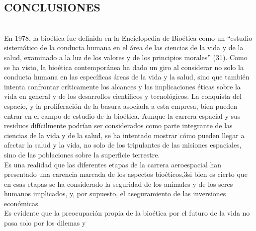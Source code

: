 \documentclass[12pt,letterpaper]{article}
\begin{document}
\begin{multicols}{2}
\section*{ \small {CONCLUSIONES}}\\
\noindent En 1978, la bioética fue definida en la Enciclopedia de
Bioética como un “estudio sistemático de la conducta
humana en el área de las ciencias de la vida y de
la salud, examinado a la luz de los valores y de los
principios morales” (31). Como se ha visto, la bioética
contemporánea ha dado un giro al considerar no solo la
conducta humana en las específicas áreas de la vida y la
salud, sino que también intenta confrontar críticamente
los alcances y las implicaciones éticas sobre la vida en
general y de los desarrollos científicos y tecnológicos.
La conquista del espacio, y la proliferación de la basura
asociada a esta empresa, bien pueden entrar en el campo
de estudio de la bioética. Aunque la carrera espacial
y sus residuos difícilmente podrían ser considerados
como parte integrante de las ciencias de la vida y de
la salud, se ha intentado mostrar cómo pueden llegar
a afectar la salud y la vida, no solo de los tripulantes de
las misiones espaciales, sino de las poblaciones sobre la
superficie terrestre.
\\

\noindent Es una realidad que las diferentes etapas de la carrera
aeroespacial han presentado una carencia marcada de
los aspectos bioéticos,3si bien es cierto que en esas
etapas se ha considerado la seguridad de los animales
y de los seres humanos implicados, y, por supuesto, el
aseguramiento de las inversiones económicas.
\\

\noindent Es evidente que la preocupación propia de la bioética
por el futuro de la vida no pasa solo por los dilemas y 

\end{multicols}
\newpage

\end{document}
